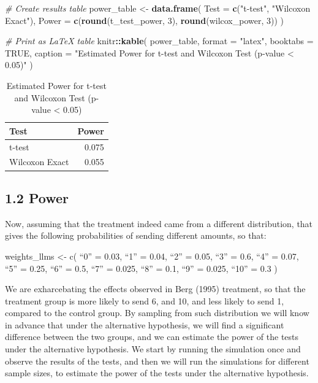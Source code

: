\documentclass[
]{article}
\newenvironment{Shaded}{\begin{snugshade}}{\end{snugshade}}
\newcommand{\AttributeTok}[1]{\textcolor[rgb]{0.13,0.29,0.53}{#1}}
\newcommand{\CommentTok}[1]{\textcolor[rgb]{0.56,0.35,0.01}{\textit{#1}}}
\newcommand{\ConstantTok}[1]{\textcolor[rgb]{0.56,0.35,0.01}{#1}}
\newcommand{\DecValTok}[1]{\textcolor[rgb]{0.00,0.00,0.81}{#1}}
\newcommand{\FunctionTok}[1]{\textcolor[rgb]{0.13,0.29,0.53}{\textbf{#1}}}
\newcommand{\NormalTok}[1]{#1}
\newcommand{\OtherTok}[1]{\textcolor[rgb]{0.56,0.35,0.01}{#1}}
\newcommand{\SpecialCharTok}[1]{\textcolor[rgb]{0.81,0.36,0.00}{\textbf{#1}}}
\newcommand{\StringTok}[1]{\textcolor[rgb]{0.31,0.60,0.02}{#1}}
\begin{document}
\begin{Shaded}
\begin{Highlighting}[]
\CommentTok{\# Create results table}
\NormalTok{power\_table }\OtherTok{\textless{}{-}} \FunctionTok{data.frame}\NormalTok{(}
  \AttributeTok{Test =} \FunctionTok{c}\NormalTok{(}\StringTok{"t{-}test"}\NormalTok{, }\StringTok{"Wilcoxon Exact"}\NormalTok{),}
  \AttributeTok{Power =} \FunctionTok{c}\NormalTok{(}\FunctionTok{round}\NormalTok{(t\_test\_power, }\DecValTok{3}\NormalTok{), }\FunctionTok{round}\NormalTok{(wilcox\_power, }\DecValTok{3}\NormalTok{))}
\NormalTok{)}

\CommentTok{\# Print as LaTeX table}
\NormalTok{knitr}\SpecialCharTok{::}\FunctionTok{kable}\NormalTok{(}
\NormalTok{  power\_table,}
  \AttributeTok{format =} \StringTok{"latex"}\NormalTok{,}
  \AttributeTok{booktabs =} \ConstantTok{TRUE}\NormalTok{,}
  \AttributeTok{caption =} \StringTok{"Estimated Power for t{-}test and Wilcoxon Test (p{-}value \textless{} 0.05)"}
\NormalTok{)}
\end{Highlighting}
\end{Shaded}

\begin{table}

\caption{\label{tab:1}Estimated Power for t-test and Wilcoxon Test (p-value < 0.05)}
\centering
\begin{tabular}[t]{lr}
\toprule
Test & Power\\
\midrule
t-test & 0.075\\
Wilcoxon Exact & 0.055\\
\bottomrule
\end{tabular}
\end{table}

\subsection{1.2 Power}\label{power}

Now, assuming that the treatment indeed came from a different
distribution, that gives the following probabilities of sending
different amounts, so that:

weights\_llms \textless- c( ``0'' = 0.03, ``1'' = 0.04, ``2'' = 0.05,
``3'' = 0.6, ``4'' = 0.07, ``5'' = 0.25, ``6'' = 0.5, ``7'' = 0.025,
``8'' = 0.1, ``9'' = 0.025, ``10'' = 0.3 )

We are exharcebating the effects observed in Berg (1995) treatment, so
that the treatment group is more likely to send 6, and 10, and less
likely to send 1, compared to the control group. By sampling from such
distribution we will know in advance that under the alternative
hypothesis, we will find a significant difference between the two
groups, and we can estimate the power of the tests under the alternative
hypothesis. We start by running the simulation once and observe the
results of the tests, and then we will run the simulations for different
sample sizes, to estimate the power of the tests under the alternative
hypothesis.
\end{document}
